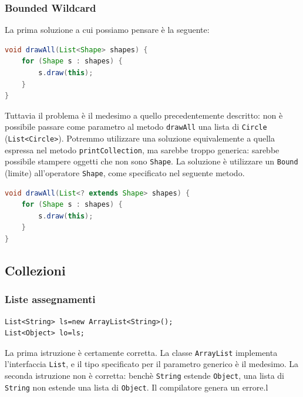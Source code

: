\documentclass{article}
\begin{document}
\subsubsection{Bounded Wildcard}

La prima soluzione a cui possiamo pensare \`e la seguente:
\begin{lstlisting}[language=Java]
void drawAll(List<Shape> shapes) { 
    for (Shape s : shapes) {
        s.draw(this); 
    }
}
\end{lstlisting}
Tuttavia il problema \`e il medesimo a quello precedentemente descritto: non \`e possibile passare come parametro al metodo \texttt{drawAll} una lista di \texttt{Circle} (\texttt{List<Circle>}). Potremmo utilizzare una soluzione equivalemente a quella espressa nel metodo \texttt{printCollection}, ma sarebbe troppo generica: sarebbe possibile stampere oggetti che non sono \texttt{Shape}. La soluzione \`e utilizzare un \texttt{Bound} (limite) all'operatore \texttt{Shape}, come specificato nel seguente metodo.
\begin{lstlisting}[language=Java]
void drawAll(List<? extends Shape> shapes) { 
    for (Shape s : shapes) {
        s.draw(this); 
    }
}
\end{lstlisting}



\subsection{Collezioni}

\subsubsection{Liste assegnamenti}

\begin{lstlisting}
List<String> ls=new ArrayList<String>();
List<Object> lo=ls;
\end{lstlisting}

La prima istruzione \`e certamente corretta. La classe \texttt{ArrayList} implementa l'interfaccia \texttt{List}, e il tipo specificato per il parametro generico \`e il medesimo. La seconda istruzione non \`e corretta: bench\`e \texttt{String} estende \texttt{Object}, una lista di \texttt{String} non estende una lista di \texttt{Object}. Il compilatore genera un errore.l
\end{document}
